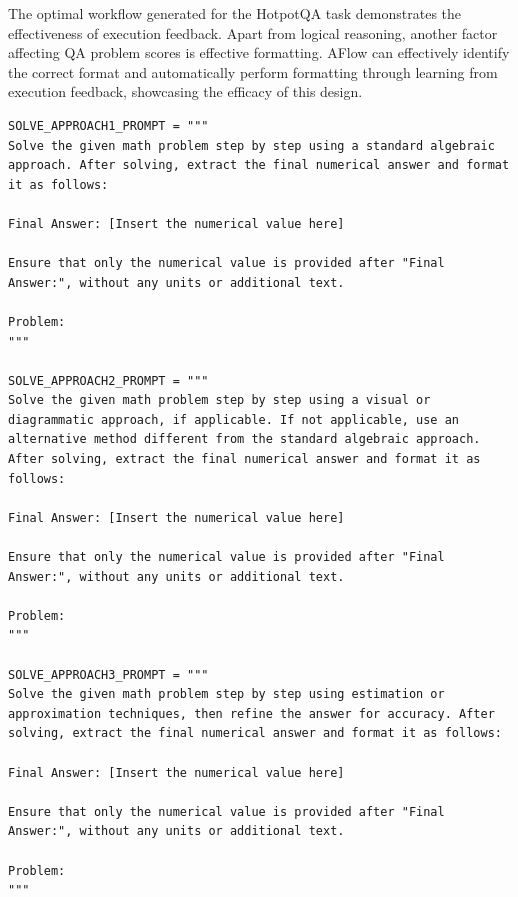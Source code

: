 \documentclass{article} %
\newcommand{\model}{{\sc AFlow}\xspace}
\theoremstyle{plain}
\theoremstyle{definition}
\theoremstyle{remark}
\begin{document}
The optimal workflow generated for the HotpotQA task demonstrates the effectiveness of execution feedback. Apart from logical reasoning, another factor affecting QA problem scores is effective formatting. \model can effectively identify the correct format and automatically perform formatting through learning from execution feedback, showcasing the efficacy of this design.

\begin{tcolorbox}[title={\textbf{\small An ensemble structure that emerged in the GSM8K ablation experiment}}, boxrule=1pt, arc=0mm, colback=black!5!white, colframe=black!75!white, breakable, before skip=10pt, after skip=10pt, pad at break=2mm, parbox=false] \begin{verbatim}
SOLVE_APPROACH1_PROMPT = """
Solve the given math problem step by step using a standard algebraic approach. After solving, extract the final numerical answer and format it as follows:

Final Answer: [Insert the numerical value here]

Ensure that only the numerical value is provided after "Final Answer:", without any units or additional text.

Problem:
"""

SOLVE_APPROACH2_PROMPT = """
Solve the given math problem step by step using a visual or diagrammatic approach, if applicable. If not applicable, use an alternative method different from the standard algebraic approach. After solving, extract the final numerical answer and format it as follows:

Final Answer: [Insert the numerical value here]

Ensure that only the numerical value is provided after "Final Answer:", without any units or additional text.

Problem:
"""

SOLVE_APPROACH3_PROMPT = """
Solve the given math problem step by step using estimation or approximation techniques, then refine the answer for accuracy. After solving, extract the final numerical answer and format it as follows:

Final Answer: [Insert the numerical value here]

Ensure that only the numerical value is provided after "Final Answer:", without any units or additional text.

Problem:
"""


\end{verbatim}
\end{tcolorbox}
\end{document}
